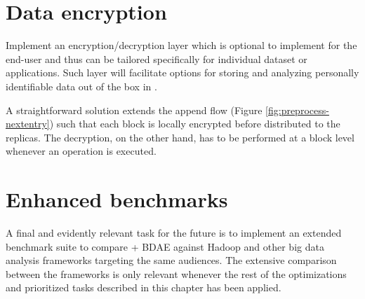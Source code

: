 \section{Data encryption}
Implement an encryption/decryption layer which is optional to implement for the end-user and thus can be tailored specifically for individual dataset or applications. Such layer will facilitate options for storing and analyzing personally identifiable data out of the box in \CodeName. 
\newline

A straightforward solution extends the append flow (Figure \ref{fig:preprocess-nextentry}) such that each block is locally encrypted before distributed to the replicas. The decryption, on the other hand, has to be performed at a block level whenever an operation is executed.

\section{Enhanced benchmarks}
A final and evidently relevant task for the future is to implement an extended benchmark suite to compare \CodeName + BDAE against Hadoop and other big data analysis frameworks targeting the same audiences. The extensive comparison between the frameworks is only relevant whenever the rest of the optimizations and prioritized tasks described in this chapter has been applied.
